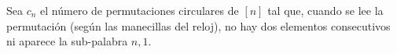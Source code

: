 Sea $c_n$ el número de permutaciones circulares de $[n]$ tal que, cuando se lee la permutación (según las manecillas del reloj), no hay dos elementos consecutivos ni aparece la sub-palabra $n,1$.
